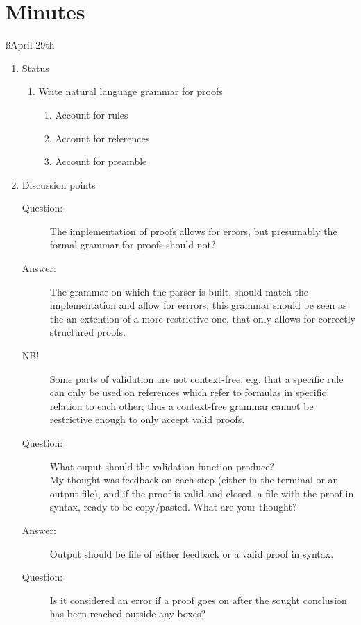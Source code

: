 \documentclass[a4paper]{article}
\begin{document}
\newpage
\section{Minutes}

\ss{April 29th}
\begin{enumerate}
  \item Status
    \begin{enumerate}[\HollowBox]
      \item[\Checkedbox] Write natural language grammar for proofs
        \begin{enumerate}[\HollowBox]
          \item[\Checkedbox] Account for rules
          \item[\Checkedbox] Account for references
          \item[\Checkedbox] Account for preamble
        \end{enumerate}
    \end{enumerate}
  \item Discussion points
    \begin{description}
      \item[Question:] The implementation of proofs allows for errors, but
      presumably the formal grammar for proofs should not?
      \item[Answer:] The grammar on which the parser is built, should match
      the implementation and allow for errrors; this grammar should be seen
      as the an extention of a more restrictive one, that only allows for
      correctly structured proofs.
      \item[NB!] Some parts of validation are not context-free, e.g. that
      a specific rule can only be used on references which refer to formulas
      in specific relation to each other; thus a context-free grammar cannot
      be restrictive enough to only accept valid proofs.
      \item[Question:] What ouput should the validation function produce?\\
      My thought was feedback on each step (either in the terminal or an 
      output file), and if the proof is valid and closed, a file with the
      proof in  syntax, ready to be copy/pasted. What are your
      thought?
      \item[Answer:] Output should be file of either feedback or a valid
      proof in  syntax.
      \item[Question:] Is it considered an error if a proof goes on after
      the sought conclusion has been reached outside any boxes?

\end{description}
\end{enumerate}
\end{document}
